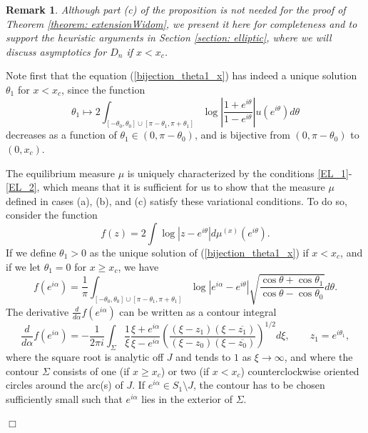 \documentclass[11pt,fleqn]{article}
\numberwithin{equation}{section}
\newtheorem{Remark}[theorem]{Remark}
\newenvironment{remark}{\begin{Remark}\rm}{\end{Remark}}
\newenvironment{proof}%
    {\rm \trivlist \item[\hskip \labelsep{\bf Proof. }]}%
    {\hspace*{\fill}$\Box$\endtrivlist}
\begin{document}
\begin{remark}
Although part (c) of the proposition is not needed for the proof of Theorem \ref{theorem: extensionWidom}, we present it here for completeness and to support the heuristic arguments in Section \ref{section: elliptic}, where we will discuss asymptotics for $D_n$ if $x< x_c$.
\end{remark}
\begin{proof}
Note first that the equation (\ref{bijection_theta1_x}) has indeed a unique solution $\theta_1$ for $x<x_c$, since the function
\begin{equation*}
\theta_{1} \mapsto 2\int_{[-\theta_{0},\theta_{0}] \cup [\pi-\theta_{1},\pi + \theta_{1}]} \log \left| \frac{1+e^{i\theta}}{1-e^{i\theta}} \right| u(e^{i\theta}) d\theta
\end{equation*} decreases as a function of $\theta_{1} \in (0,\pi-\theta_{0})$, and is bijective from $(0,\pi-\theta_{0})$ to $(0,x_c)$. 

\medskip

The equilibrium measure $\mu$ is uniquely characterized by the conditions \eqref{EL_1}-\eqref{EL_2}, which means that it is sufficient for us to show that the measure $\mu$ defined in cases (a), (b), and (c) satisfy these variational conditions. 
To do so, consider the function
\begin{equation}
f(z) =2\int \log | z-e^{i\theta}| d\mu^{(x)}(e^{i\theta}).
\end{equation}
If we define $\theta_1>0$ as the unique solution of (\ref{bijection_theta1_x}) if $x<x_c$, and if we let $\theta_1=0$ for $x\geq x_c$, we have
\begin{equation}
f(e^{i\alpha})=\frac{1}{\pi}\int_{[-\theta_0,\theta_0]\cup[\pi-\theta_1,\pi+\theta_1]} \log | e^{i\alpha}-e^{i\theta}|\sqrt{\frac{\cos \theta + \cos \theta_{1}}{\cos \theta - \cos \theta_{0}}}d\theta.
\end{equation}
The derivative $\frac{d}{d\alpha} f(e^{i\alpha})$ can be written as a contour integral 
\begin{equation}
\frac{d}{d\alpha} f(e^{i\alpha})=-\frac{1}{2\pi i}\int_\Sigma \frac{1}{\xi}\frac{\xi+e^{i\alpha}}{\xi-e^{i\alpha}}\left(\frac{(\xi-z_1)(\xi-\overline{z_1})}{(\xi-z_0)(\xi-\overline{z_0})}\right)^{1/2}d\xi, \qquad z_{1} = e^{i\theta_{1}},
\end{equation}
where the square root is analytic off $J$ and tends to $1$ as $\xi\to\infty$, and
where the contour $\Sigma$ consists of one (if $x\geq x_c$) or two (if $x<x_c$) counterclockwise oriented circles around the arc(s) of $J$. If $e^{i\alpha}\in S_1\setminus J$, the contour has to be chosen sufficiently small such that $e^{i\alpha}$ lies in the exterior of $\Sigma$.


\end{proof}
\end{document}
